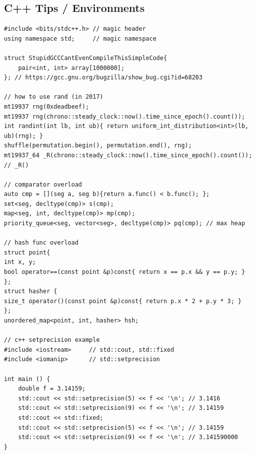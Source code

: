 \documentclass[landscape, 8pt, a4paper, oneside, twocolumn]{extarticle}
\begin{document}
\subsection {C++ Tips / Environments}
\begin{verbatim}
#include <bits/stdc++.h> // magic header
using namespace std;     // magic namespace

struct StupidGCCCantEvenCompileThisSimpleCode{
    pair<int, int> array[1000000];
}; // https://gcc.gnu.org/bugzilla/show_bug.cgi?id=68203

// how to use rand (in 2017)
mt19937 rng(0xdeadbeef);
mt19937 rng(chrono::steady_clock::now().time_since_epoch().count());
int randint(int lb, int ub){ return uniform_int_distribution<int>(lb, ub)(rng); }
shuffle(permutation.begin(), permutation.end(), rng);
mt19937_64 _R(chrono::steady_clock::now().time_since_epoch().count()); // _R()

// comparator overload
auto cmp = [](seg a, seg b){return a.func() < b.func(); };
set<seg, decltype(cmp)> s(cmp); 
map<seg, int, decltype(cmp)> mp(cmp);
priority_queue<seg, vector<seg>, decltype(cmp)> pq(cmp); // max heap

// hash func overload
struct point{
int x, y;
bool operator==(const point &p)const{ return x == p.x && y == p.y; }
};
struct hasher {
size_t operator()(const point &p)const{ return p.x * 2 + p.y * 3; }
};
unordered_map<point, int, hasher> hsh;

// c++ setprecision example
#include <iostream>     // std::cout, std::fixed
#include <iomanip>      // std::setprecision

int main () {
    double f = 3.14159;
    std::cout << std::setprecision(5) << f << '\n'; // 3.1416
    std::cout << std::setprecision(9) << f << '\n'; // 3.14159
    std::cout << std::fixed;
    std::cout << std::setprecision(5) << f << '\n'; // 3.14159
    std::cout << std::setprecision(9) << f << '\n'; // 3.141590000
}
\end{verbatim}

\end{document}

